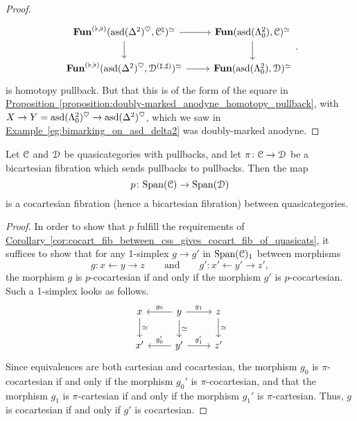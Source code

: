 \documentclass[main.tex]{subfiles}
\begin{document}
\begin{proof}
  \begin{equation*}
    \begin{tikzcd}
      \Fun^{(\flat, \flat)}(\asd(\Delta^{2})^{\heartsuit}, \category{C}^{\natural})^{\simeq}
      \arrow[r]
      \arrow[d]
      & \Fun(\asd(\Lambda^{2}_{0}), \category{C})^{\simeq}
      \arrow[d]
      \\
      \Fun^{(\flat, \flat)}(\asd(\Delta^{2})^{\heartsuit}, \category{D}^{(\sharp, \sharp)})^{\simeq}
      \arrow[r]
      & \Fun(\asd(\Lambda^{2}_{0}), \category{D})^{\simeq}
    \end{tikzcd}.
  \end{equation*}
  is homotopy pullback. But that this is of the form of the square in \hyperref[proposition:doubly-marked_anodyne_homotopy_pullback]{Proposition~\ref*{proposition:doubly-marked_anodyne_homotopy_pullback}}, with $X \to Y = \mathrm{asd}(\Lambda^{2}_{0})^{\heartsuit} \to \mathrm{asd}(\Delta^{2})^{\heartsuit}$, which we saw in \hyperref[eg:bimarking_on_asd_delta2]{Example~\ref*{eg:bimarking_on_asd_delta2}} was doubly-marked anodyne.
\end{proof}

\begin{theorem}
  Let $\mathcal{C}$ and $\mathcal{D}$ be quasicategories with pullbacks, and let $\pi\colon \mathcal{C} \to \mathcal{D}$ be a bicartesian fibration which sends pullbacks to pullbacks. Then the map
  \begin{equation*}
    p\colon \mathrm{Span}(\mathcal{C}) \to \mathrm{Span}(\mathcal{D})
  \end{equation*}
  is a cocartesian fibration (hence a bicartesian fibration) between quasicategories.
\end{theorem}
\begin{proof}
  In order to show that $p$ fulfill the requirements of \hyperref[cor:cocart_fib_between_css_gives_cocart_fib_of_quasicats]{Corollary~\ref*{cor:cocart_fib_between_css_gives_cocart_fib_of_quasicats}}, it suffices to show that for any 1-simplex $g \to g'$ in $\mathrm{Span}(\mathcal{C})_{1}$ between morphisms
  \begin{equation*}
    g\colon x \leftarrow y \to z \qquad\text{and}\qquad g'\colon x' \leftarrow y' \to z',
  \end{equation*}
  the morphism $g$ is $p$-cocartesian if and only if the morphism $g'$ is $p$-cocartesian. Such a 1-simplex looks as follows.
  \begin{equation*}
    \begin{tikzcd}
      x
      \arrow[d, "\simeq"]
      & y
      \arrow[l, swap, "g_{0}"]
      \arrow[r, "g_{1}"]
      \arrow[d, "\simeq"]
      & z
      \arrow[d, "\simeq"]
      \\
      x'
      & y'
      \arrow[l, swap, "g'_{0}"]
      \arrow[r, "g'_{1}"]
      & z'
    \end{tikzcd}
  \end{equation*}
  Since equivalences are both cartesian and cocartesian, the morphism $g_{0}$ is $\pi$-cocartesian if and only if the morphism $g_{0}'$ is $\pi$-cocartesian, and that the morphism $g_{1}$ is $\pi$-cartesian if and only if the morphism $g_{1}'$ is $\pi$-cartesian. Thus, $g$ is cocartesian if and only if $g'$ is cocartesian.
\end{proof}
\end{document}
